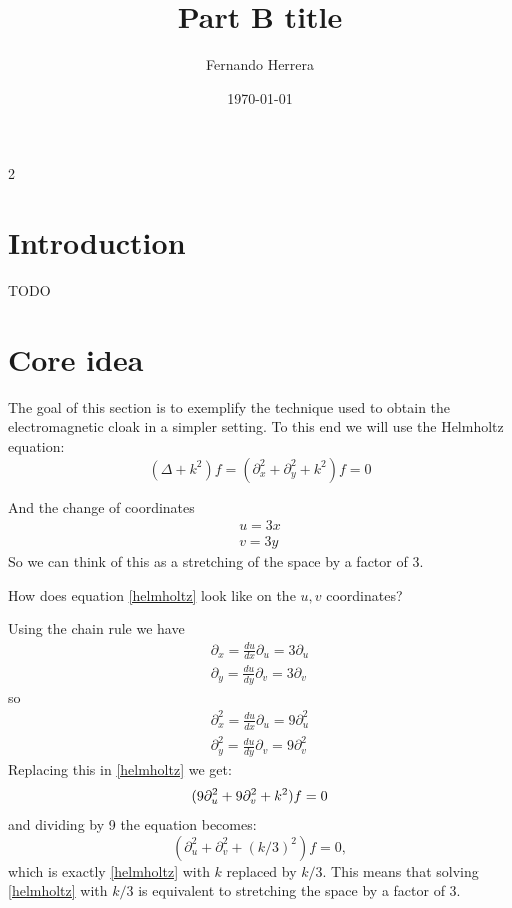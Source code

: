 \documentclass{article}
\begin{document}
\newcommand{\R}{\mathbb{R}}
\newcommand\tbf[1]{\textbf{#1}}
\newcommand\myworries[1]{\textcolor{red}{\tbf{#1}}}

\title{Part B title}
\author{Fernando Herrera}
\date{\today}
\maketitle

\begin{multicols}{2}
\section{Introduction}
TODO \cite{thompson12}
\section{Core idea}
The goal of this section is to exemplify the technique used to obtain the electromagnetic cloak in a simpler setting.
To this end we will use the Helmholtz equation:
\begin{equation}
	\label{helmholtz}
	(\Delta + k^2)f=(\partial_x^2+\partial_y^2 + k^2)f=0
\end{equation}

And the change of coordinates
\begin{equation}
\begin{split}
	u=3x\\
	v=3y
\end{split}
\end{equation}
So we can think of this as a stretching of the space by a factor of 3.

How does equation \eqref{helmholtz} look like on the \(u,v\) coordinates?

Using the chain rule we have
\begin{equation}
\begin{split}
	\partial_x=\frac{du}{dx}\partial_u=3\partial_u\\
	\partial_y=\frac{du}{dy}\partial_v=3\partial_v
\end{split}
\end{equation}
so
\begin{equation}
\begin{split}
	\partial_x^2=\frac{du}{dx}\partial_u=9\partial_u^2\\
	\partial_y^2=\frac{du}{dy}\partial_v=9\partial_v^2
\end{split}
\end{equation}
Replacing this in \eqref{helmholtz} we get:
\begin{equation}
(9\partial_u^2+9\partial_v^2 +k^2)f=0\\
\end{equation}
and dividing by 9 the equation becomes:
\begin{equation}
(\partial_u^2+\partial_v^2 +(k/3)^2)f=0,
\end{equation}
which is exactly \eqref{helmholtz} with \(k\) replaced by \(k/3\).
This means that solving \eqref{helmholtz} with \(k/3\) is equivalent to
stretching the space by a factor of 3.

\end{multicols}
\printbibliography
\end{document}
